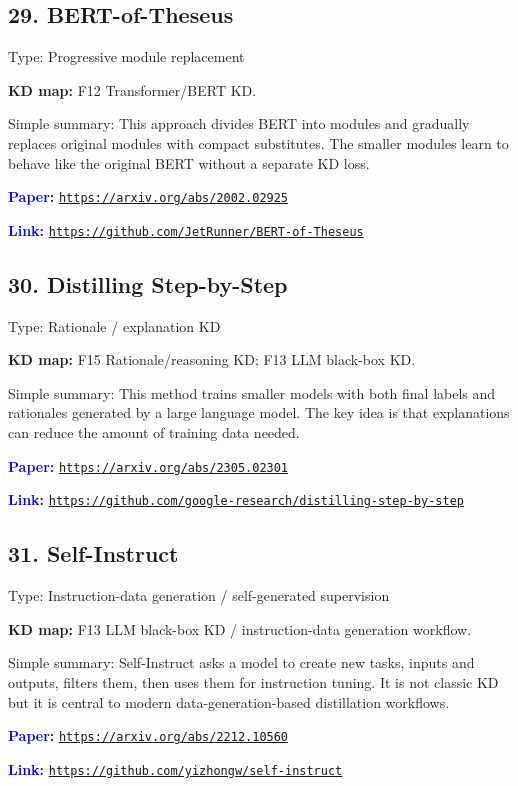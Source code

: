 \documentclass[10pt]{article}
\begin{document}
\subsection*{29. BERT-of-Theseus}
Type: Progressive module replacement\par
\textbf{KD map:} F12 Transformer/BERT KD.\par
Simple summary: This approach divides BERT into modules and gradually replaces original modules with compact substitutes. The smaller modules learn to behave like the original BERT without a separate KD loss.\par
\textcolor{blue}{\textbf{Paper:}} \href{https://arxiv.org/abs/2002.02925}{\nolinkurl{https://arxiv.org/abs/2002.02925}}\par
\textcolor{blue}{\textbf{Link:}} \href{https://github.com/JetRunner/BERT-of-Theseus}{\nolinkurl{https://github.com/JetRunner/BERT-of-Theseus}}\par

\subsection*{30. Distilling Step-by-Step}
Type: Rationale / explanation KD\par
\textbf{KD map:} F15 Rationale/reasoning KD; F13 LLM black-box KD.\par
Simple summary: This method trains smaller models with both final labels and rationales generated by a large language model. The key idea is that explanations can reduce the amount of training data needed.\par
\textcolor{blue}{\textbf{Paper:}} \href{https://arxiv.org/abs/2305.02301}{\nolinkurl{https://arxiv.org/abs/2305.02301}}\par
\textcolor{blue}{\textbf{Link:}} \href{https://github.com/google-research/distilling-step-by-step}{\nolinkurl{https://github.com/google-research/distilling-step-by-step}}\par

\subsection*{31. Self-Instruct}
Type: Instruction-data generation / self-generated supervision\par
\textbf{KD map:} F13 LLM black-box KD / instruction-data generation workflow.\par
Simple summary: Self-Instruct asks a model to create new tasks, inputs and outputs, filters them, then uses them for instruction tuning. It is not classic KD but it is central to modern data-generation-based distillation workflows.\par
\textcolor{blue}{\textbf{Paper:}} \href{https://arxiv.org/abs/2212.10560}{\nolinkurl{https://arxiv.org/abs/2212.10560}}\par
\textcolor{blue}{\textbf{Link:}} \href{https://github.com/yizhongw/self-instruct}{\nolinkurl{https://github.com/yizhongw/self-instruct}}\par
\end{document}
